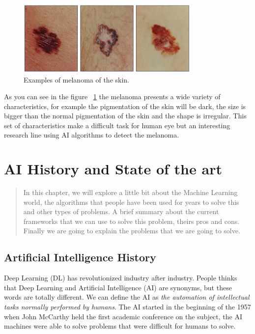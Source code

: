 \begin{figure}[H]
\centering
\includegraphics[width=0.8\textwidth]{./figures/melanoma-examples.jpg}
\caption{Examples of melanoma of the skin. \cite{melanoma-stadistics}}
\label{fig:jobInformationDialog}
\end{figure}

As you can see in the figure ~\ref{fig:jobInformationDialog} the melanoma presents a wide variety of characteristics, for example the pigmentation of the skin will be dark, the size is bigger than the normal pigmentation of the skin and the shape is irregular. This set of characteristics make a difficult task for human eye but an interesting research line using AI algorithms to detect the melanoma. 


\chapter{AI History and State of the art}

\begin{abstract}
In this chapter, we will explore a little bit about the Machine Learning world, 
the algorithms that people have been used for years to solve this and other types of problems. A brief summary about the current frameworks that we can use to solve this problem, theirs pros and cons. Finally we are going to explain the problems that we are going to solve. 
\end{abstract}


\section{Artificial Intelligence History}

Deep Learning (DL) has revolutionized industry after industry. People thinks that Deep Learning and Artificial Intelligence (AI) are synonyms, but these words are totally different.
We can define the AI as \emph{the automation of intellectual tasks normally performed by humans}.
The AI started in the beginning of the 1957 when John McCarthy held the first academic conference on the subject, the AI machines were able to solve problems that were difficult for humans to solve.

